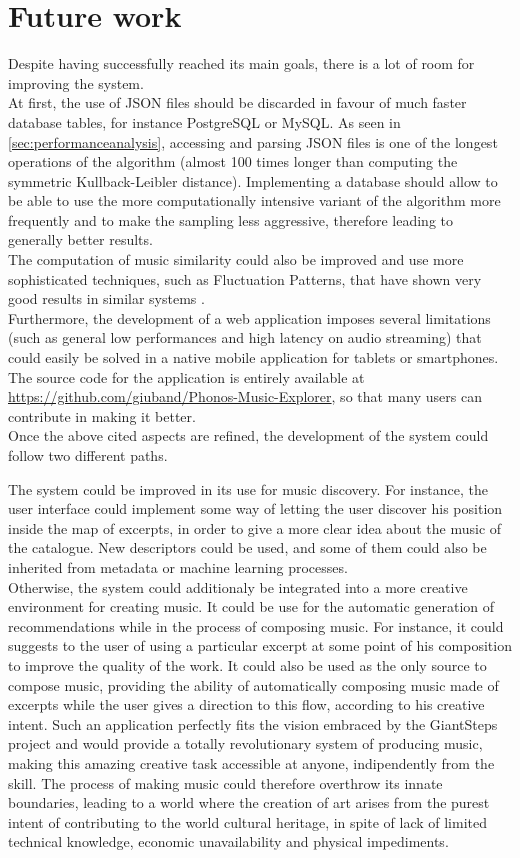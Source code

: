\section{Future work}
Despite having successfully reached its main goals, there is a lot of room for improving the system. \\
At first, the use of JSON files should be discarded in favour of much faster database tables, for instance PostgreSQL or MySQL. As seen in \ref{sec:performanceanalysis}, accessing and parsing JSON files is one of the longest operations of the algorithm (almost 100 times longer than computing the symmetric Kullback-Leibler distance). Implementing a database should allow to be able to use the more computationally intensive variant of the algorithm more frequently and to make the sampling less aggressive, therefore leading to generally better results. \\
The computation of music similarity could also be improved and use more sophisticated techniques, such as Fluctuation Patterns, that have shown very good results in similar systems \cite{pohle09}. \\
Furthermore, the development of a web application imposes several limitations (such as general low performances and high latency on audio streaming) that could easily be solved in a native mobile application for tablets or smartphones. \\
The source code for the application is entirely available at \url{https://github.com/giuband/Phonos-Music-Explorer}, so that many users can contribute in making it better.\\
Once the above cited aspects are refined, the development of the system could follow two different paths.

The system could be improved in its use for music discovery. For instance, the user interface could implement some way of letting the user discover his position inside the map of excerpts, in order to give a more clear idea about the music of the catalogue. New descriptors could be used, and some of them could also be inherited from metadata or machine learning processes. \\ Otherwise, the system could additionaly be integrated into a more creative environment for creating music. It could be use for the automatic generation of recommendations while in the process of composing music. For instance, it could suggests to the user of using a particular excerpt at some point of his composition to improve the quality of the work. It could also be used as the only source to compose music, providing the ability of automatically composing music made of excerpts while the user gives a direction to this flow, according to his creative intent. Such an application perfectly fits the vision embraced by the GiantSteps project and would provide a totally revolutionary system of producing music, making this amazing creative task accessible at anyone, indipendently from the skill. The process of making music could therefore overthrow its innate boundaries, leading to a world where the creation of art arises from the purest intent of contributing to the world cultural heritage, in spite of lack of limited technical knowledge, economic unavailability and physical impediments.